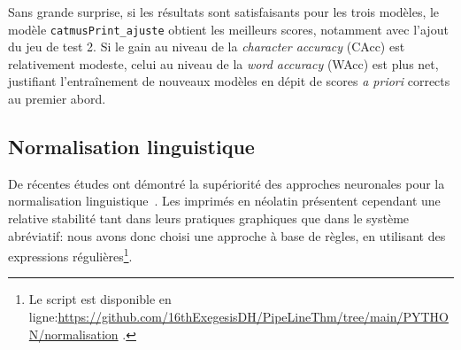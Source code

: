 \documentclass[final, fra]{anthology-ch}      %
\begin{document}
\vspace{0.3cm}
\begin{table}
    \centering\footnotesize\vspace{-.6cm}
    \caption{Corpus de données \textit{out-of-domain} pour le test d'ATR.}
    \label{tab:outOfDomain}
\end{table}

Sans grande surprise, si les résultats sont satisfaisants pour les trois modèles, le modèle \texttt{catmusPrint\_ajuste} obtient les meilleurs scores, notamment avec l'ajout du jeu de test 2. Si le gain au niveau de la \textit{character accuracy} (CAcc) est relativement modeste, celui au niveau de la \textit{word accuracy} (WAcc) est plus net, justifiant l'entraînement de nouveaux modèles en dépit de scores \textit{a priori} corrects au premier abord.

\subsection{Normalisation linguistique}
\label{sec:normalisation}
De récentes études ont démontré la supériorité des approches neuronales pour la normalisation linguistique~\cite{gabay-barrault-2020-traduction,bawden:hal-03540226}. Les imprimés en néolatin présentent cependant une relative stabilité tant dans leurs pratiques graphiques que dans le système abréviatif: nous avons donc choisi une approche à base de règles, en utilisant des expressions régulières\footnote{Le script est disponible en ligne:\url{https://github.com/16thExegesisDH/PipeLineThm/tree/main/PYTHON/normalisation}
.}.
\end{document}

